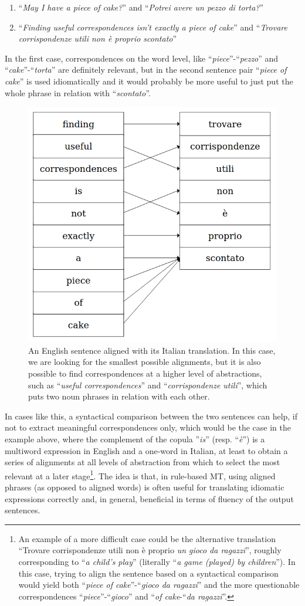 \begin{enumerate}
    \item ``\textit{May I have a piece of cake?}'' and ``\textit{Potrei avere un pezzo di torta?}''
    \item ``\textit{Finding useful correspondences isn't exactly a piece of cake}'' and ``\textit{Trovare corrispondenze utili non è proprio scontato}''
\end{enumerate} \smallskip

In the first case, correspondences on the word level, like ``\textit{piece}''-``\textit{pezzo}'' and ``\textit{cake}''-``\textit{torta}'' are definitely relevant, but in the second sentence pair ``\textit{piece of cake}'' is used idiomatically and it would probably be more useful to just put the whole phrase in relation with ``\textit{scontato}''. \smallskip

\begin{figure}[H]
    \centering
    \includegraphics[width=.4\linewidth]{figure/alignment.png}
    \caption[An English sentence aligned with its Italian translation]{An English sentence aligned with its Italian translation. In this case, we are looking for the smallest possible alignments, but it is also possible to find correspondences at a higher level of abstractions, such as ``\textit{useful correspondences}'' and ``\textit{corrispondenze utili}'', which puts two noun phrases in relation with each other.} \label{cake}
\end{figure}

In cases like this, a syntactical comparison between the two sentences can help, if not to extract meaningful correspondences only, which would be the case in the example above, where the complement of the copula ''\textit{is}'' (resp. ``\textit{è}'') is a multiword expression in English and a one-word in Italian, at least to obtain a series of alignments at all levels of abstraction from which to select the most relevant at a later stage\footnote{An example of a more difficult case could be the alternative translation ``Trovare corrispondenze utili non è proprio \textit{un gioco da ragazzi}'', roughly corresponding to ``\textit{a child's play}'' (literally ``\textit{a game (played) by children}''). In this case, trying to align the sentence based on a syntactical comparison would yield both ``\textit{piece of cake}''-``\textit{gioco da ragazzi}'' and the more questionable correspondences ``\textit{piece}''-``\textit{gioco}'' and ``\textit{of cake}-``\textit{da ragazzi}''.}. 
The idea is that, in rule-based MT, using aligned phrases (as opposed to aligned words) is often useful for translating idiomatic expressions correctly and, in general, beneficial in terms of fluency of the output sentences.\smallskip
 
